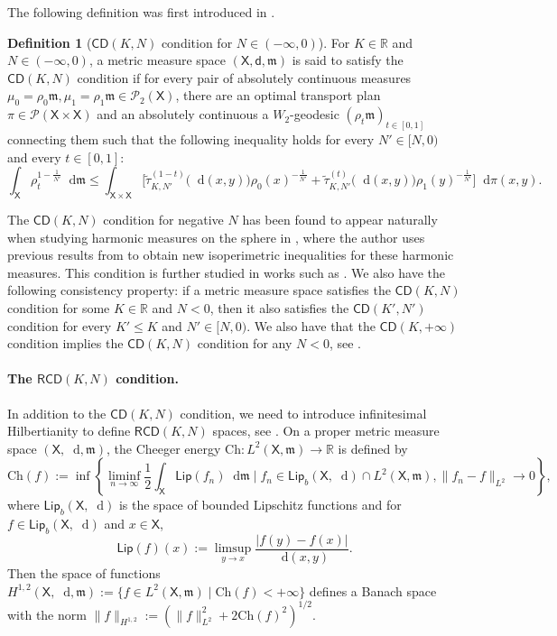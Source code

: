 \documentclass[11pt,twoside,a4paper]{article}
\newcommand*\diff{\mathop{}\!\mathrm{d}}
\newcommand{\R}{\mathbb{R}}
\newcommand{\prob}{\mathscr P}
\newcommand{\cd}{\mathsf{CD}}
\newcommand{\RCD}{\mathsf{RCD}}
\newcommand{\X}{\mathsf{X}}
\newcommand{\Lip}{\mathsf {Lip}}
\newcommand{\di}
{\mathsf d} %
\newcommand{\m}{\mathfrak m} %
\newcommand{\Prob}{\mathscr{P}}
\theoremstyle{theorem}
\theoremstyle{definition}
\newtheorem{definition}[theorem]{Definition}
\theoremstyle{remark}
\theoremstyle{proof}
\begin{document}
\noindent The following definition was first introduced in \cite{Ohta-negativeCD}.
\begin{definition}[{$\cd(K,N)$ condition for $N\in(-\infty,0)$}]
For $K\in\R$ and $N\in(-\infty,0)$,
a metric measure space $(\X,\di,\m)$ is said to satisfy the $\cd(K,N)$ condition if for every pair of absolutely continuous measures $\mu_0=\rho_0\m,\mu_1= \rho_1 \m \in \Prob_2(\X)$, there are an optimal transport plan $\pi\in\prob(\X\times \X)$ and an absolutely continuous a $W_2$-geodesic $(\rho_t\m)_{t\in [0,1]}$ connecting them such that the following inequality holds for every $N'\in[N,0)$ and every $t \in [0,1]$:
\begin{equation*}\label{eq:CDnegative}
    \int_\X \rho_t^{1-\frac 1{N'}} \diff \m \leq \int_{\X \times \X} \Big[ \tilde{\tau}^{(1-t)}_{K,N'} \big(\diff(x,y) \big) \rho_{0}(x)^{-\frac{1}{N'}} +    \tilde{\tau}^{(t)}_{K,N'} \big(\diff(x,y) \big) \rho_{1}(y)^{-\frac{1}{N'}} \Big]    \diff \pi( x,y).
\end{equation*}
\end{definition}
\noindent The $\cd(K,N)$ condition for negative $N$ has been found to appear naturally when studying harmonic measures on the sphere in \cite{Milman2017}, where the author uses previous results from \cite{Milman2017a} to obtain new isoperimetric inequalities for these harmonic measures. This condition is further studied in works such as \cite{Magnabosco2023b, Magnabosco2023a, Magnabosco2023c}. We also have the following consistency property: if a metric measure space satisfies the $\mathsf{CD}(K, N)$ condition for some $K \in \R$ and $N < 0$, then it also satisfies the $\mathsf{CD}(K', N')$ condition for every $K' \leq K$ and $N' \in [N, 0)$. We also have that the $\mathsf{CD}(K, +\infty)$ condition implies the $\mathsf{CD}(K, N)$ condition for any $N < 0$, see \cite[Lemma 2.9]{Ohta-negativeCD}.

\paragraph{The \texorpdfstring{$\RCD(K,N)$}{RCD(K, N)} condition.}
In addition to the $\cd(K,N)$ condition,
we need to introduce infinitesimal Hilbertianity to define $\RCD(K,N)$ spaces, see \cite{Gigli12}.
On a proper metric measure space $(\X,\diff,\m)$,
the Cheeger energy $\mathrm{Ch}:L^2(\X,\m)\to \R$ is defined by
\[\mathrm{Ch}(f):=\inf\left\{\liminf_{n\to \infty}\frac{1}{2}\int_\X\Lip(f_n)\diff \m\mid f_n\in\Lip_b(\X,\diff)\cap L^2(\X,\m),\|f_n-f\|_{L^2}\to 0\right\},\]
where $\Lip_b(\X,\diff)$ is the space of bounded Lipschitz functions and for $f\in\Lip_b(\X,\diff)$ and $x\in \X$,
\[\Lip(f)(x):=\limsup_{y\to x}\frac{|f(y)-f(x)|}{\diff(x,y)}.\]
Then the space of functions $H^{1,2}(\X,\diff,\m):=\{f\in L^2(\X,\m)\mid \mathrm{Ch}(f)<+\infty\}$ defines a Banach space with the norm $\|f\|_{H^{1,2}}:=\left(\|f\|_{L^2}^2+2\mathrm{Ch}(f)^2\right)^{1/2}$.
\end{document}
